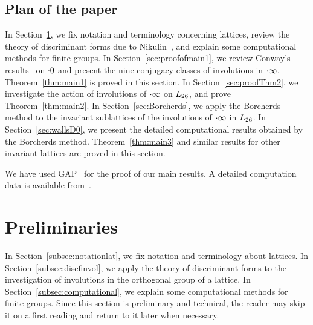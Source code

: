 \documentclass{amsart} %
\begin{document}
\subsection{Plan of the paper}\label{subsec:plan}
%
In Section~\ref{sec:prelim},
we fix notation and terminology concerning lattices, 
review the theory of discriminant forms
due to Nikulin~\cite{MR525944}, 
and explain some computational methods 
for finite groups.
In Section~\ref{sec:proofofmain1},
we review Conway's results~\cite[Chapter 10]{theCSbook} on $\cdot 0$
and present the nine conjugacy classes of involutions in $\cdot \infty$.
Theorem~\ref{thm:main1} is proved in this section.
In Section~\ref{sec:proofThm2},
we investigate the action of involutions of $\cdot \infty$ on $L_{26}$,
and prove Theorem~\ref{thm:main2}.
In Section~\ref{sec:Borcherds},
we apply the Borcherds method to the invariant sublattices of the involutions 
of $\cdot \infty$ in $L_{26}$.
In Section~\ref{sec:wallsD0},
we present the detailed computational results obtained by
 the Borcherds method.
 Theorem~\ref{thm:main3} and similar results for other invariant lattices are proved in this section.
%
\par
We have used GAP~\cite{GAP4} 
for the proof of our main results.
A detailed computation data is available from~\cite{affConwayCompdata}.
%
\section{Preliminaries}\label{sec:prelim}
%
In Section~\ref{subsec:notationlat}, 
we fix notation and terminology about lattices.
In Section~\ref{subsec:discfinvol},
we apply the theory of discriminant forms
to the investigation of involutions in the orthogonal group of a lattice.
In Section~\ref{subsec:computational},
we explain some computational methods 
for finite groups.
Since this section is preliminary and technical, the reader may skip it on a first reading and return to it later when necessary.
%
%
\end{document}
